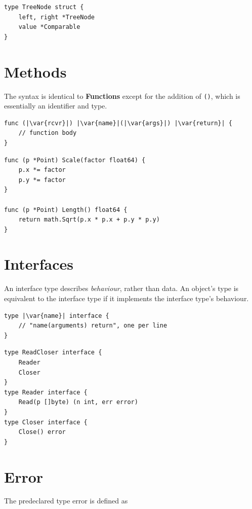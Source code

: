 \documentclass{article}
\newcommand{\var}[1]{\texttt{\textit{\underbar{#1}}}}
\begin{document}
\begin{multicols*}{3}
\begin{lstlisting}[frame=single]
type TreeNode struct {
    left, right *TreeNode
    value *Comparable
}
\end{lstlisting}

  \filbreak
  \section*{Methods}

  The syntax is identical to {\color{macewan}\bfseries{}Functions} except for the addition of \texttt{(\var{rcvr})}, which is essentially an identifier and type.

\begin{lstlisting}[escapechar=|]
func (|\var{rcvr}|) |\var{name}|(|\var{args}|) |\var{return}| {
    // function body
}
\end{lstlisting}

\begin{lstlisting}[frame=single,escapechar=|]
func (p *Point) Scale(factor float64) {
    p.x *= factor
    p.y *= factor
}

func (p *Point) Length() float64 {
    return math.Sqrt(p.x * p.x + p.y * p.y)
}
\end{lstlisting}

  \filbreak
  \section*{Interfaces}

  An interface type describes \textit{behaviour}, rather than data.
  An object's type is equivalent to the interface type if it implements the interface type's behaviour.

\begin{lstlisting}[escapechar=|]
type |\var{name}| interface {
    // "name(arguments) return", one per line
}
\end{lstlisting}

\begin{lstlisting}[frame=single,escapechar=|]
type ReadCloser interface {
    Reader
    Closer
}
type Reader interface {
    Read(p []byte) (n int, err error)
}
type Closer interface {
    Close() error
}
\end{lstlisting}

  \filbreak
  \section*{Error}

The predeclared type error is defined as


\end{multicols*}
\end{document}
